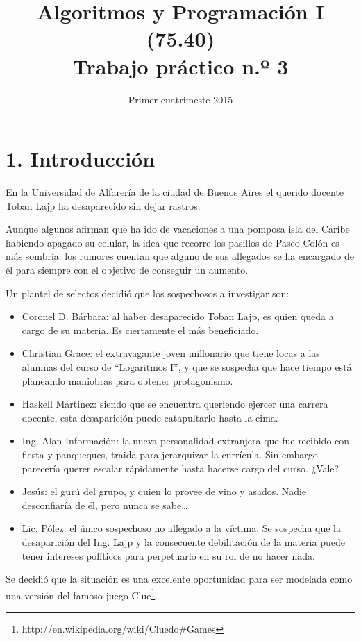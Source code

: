 \documentclass[12pt,spanish,]{article}
\title{Algoritmos y Programación I (75.40)\\Trabajo práctico n.º 3}
\date{Primer cuatrimeste 2015}
\begin{document}
\maketitle

\section{1. Introducción}\label{introducciuxf3n}

En la Universidad de Alfarería de la ciudad de Buenos Aires el querido
docente Toban Lajp ha desaparecido sin dejar rastros.

Aunque algunos afirman que ha ido de vacaciones a una pomposa isla del
Caribe habiendo apagado su celular, la idea que recorre los pasillos de
Paseo Colón es más sombría: los rumores cuentan que alguno de sus
allegados se ha encargado de él para siempre con el objetivo de
conseguir un aumento.

Un plantel de selectos decidió que los sospechosos a investigar son:

\begin{itemize}
\itemsep1pt\parskip0pt
\item
  Coronel D. Bárbara: al haber desaparecido Toban Lajp, es quien queda a
  cargo de su materia. Es ciertamente el más beneficiado.
\item
  Christian Grace: el extravagante joven millonario que tiene locas a
  las alumnas del curso de ``Logaritmos I'', y que se sospecha que hace
  tiempo está planeando maniobras para obtener protagonismo.
\item
  Haskell Martinez: siendo que se encuentra queriendo ejercer una
  carrera docente, esta desaparición puede catapultarlo hasta la cima.
\item
  Ing. Alan Información: la nueva personalidad extranjera que fue
  recibido con fiesta y panqueques, traida para jerarquizar la
  currícula. Sin embargo parecería querer escalar rápidamente hasta
  hacerse cargo del curso. ¿Vale?
\item
  Jesús: el gurú del grupo, y quien lo provee de vino y asados. Nadie
  desconfiaría de él, pero nunca se sabe\ldots{}
\item
  Lic. Pólez: el único sospechoso no allegado a la víctima. Se sospecha
  que la desaparición del Ing. Lajp y la consecuente debilitación de la
  materia puede tener intereses políticos para perpetuarlo en su rol de
  no hacer nada.
\end{itemize}

Se decidió que la situación es una excelente oportunidad para ser
modelada como una versión del famoso juego Clue\footnote{http://en.wikipedia.org/wiki/Cluedo\#Games}.
\end{document}
